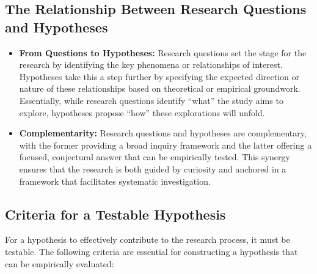 \documentclass[
]{book}
\begin{document}
\hypertarget{the-relationship-between-research-questions-and-hypotheses}{%
\subsection*{The Relationship Between Research Questions and Hypotheses}\label{the-relationship-between-research-questions-and-hypotheses}}

\begin{itemize}
\item
  \textbf{From Questions to Hypotheses:} Research questions set the stage for the research by identifying the key phenomena or relationships of interest. Hypotheses take this a step further by specifying the expected direction or nature of these relationships based on theoretical or empirical groundwork. Essentially, while research questions identify ``what'' the study aims to explore, hypotheses propose ``how'' these explorations will unfold.
\item
  \textbf{Complementarity:} Research questions and hypotheses are complementary, with the former providing a broad inquiry framework and the latter offering a focused, conjectural answer that can be empirically tested. This synergy ensures that the research is both guided by curiosity and anchored in a framework that facilitates systematic investigation.
\end{itemize}

\hypertarget{criteria-for-a-testable-hypothesis}{%
\subsection*{Criteria for a Testable Hypothesis}\label{criteria-for-a-testable-hypothesis}}

For a hypothesis to effectively contribute to the research process, it must be testable. The following criteria are essential for constructing a hypothesis that can be empirically evaluated:
\end{document}
